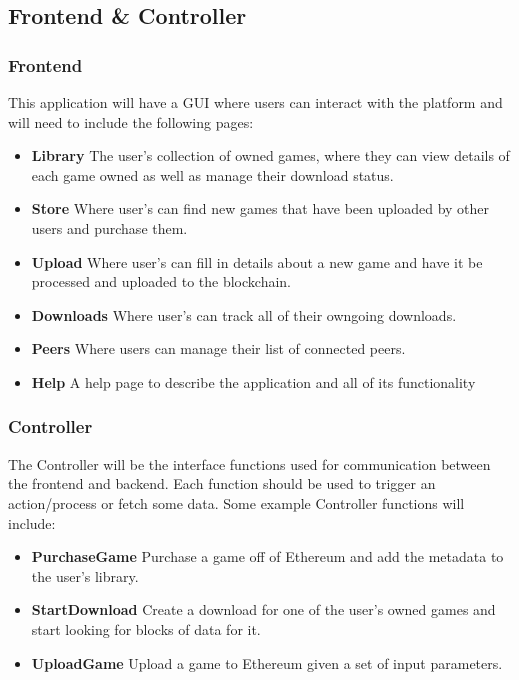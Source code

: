 \subsection{Frontend \& Controller}

\subsubsection{Frontend}\label{subsubsec:frontend}

This application will have a GUI   where users can interact with the platform and will need to include the following pages:

\begin{itemize}
  \item \textbf{Library} The user's collection of owned games, where they can view details of each game owned as well as manage their download status.
  \item \textbf{Store} Where user's can find new games that have been uploaded by other users and purchase them.
  \item \textbf{Upload} Where user's can fill in details about a new game and have it be processed and uploaded to the blockchain.
  \item \textbf{Downloads} Where user's can track all of their owngoing downloads.
  \item \textbf{Peers} Where users can manage their list of connected peers.
  \item \textbf{Help} A help page to describe the application and all of its functionality 
\end{itemize}


\subsubsection{Controller}

The Controller will be the interface functions used for communication between the frontend and backend. Each function should be used to trigger an action/process or fetch some data. Some example Controller functions will include:

\begin{itemize}
  \item \textbf{PurchaseGame} Purchase a game off of Ethereum and add the metadata to the user's library.
  \item \textbf{StartDownload} Create a download for one of the user's owned games and start looking for blocks of data for it.
  \item \textbf{UploadGame} Upload a game to Ethereum given a set of input parameters.
\end{itemize}